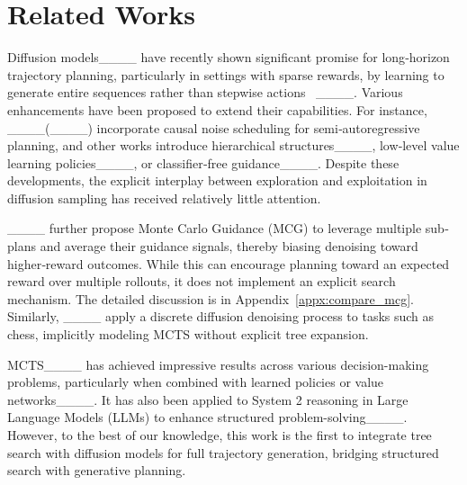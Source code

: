 \section{Related Works}
Diffusion models____ have recently shown significant promise for long‐horizon trajectory planning, particularly in settings with sparse rewards, by learning to generate entire sequences rather than stepwise actions~ ____. Various enhancements have been proposed to extend their capabilities. For instance, ____(____) incorporate causal noise scheduling for semi‐autoregressive planning, and other works introduce hierarchical structures____, low‐level value learning policies____, or classifier‐free guidance____. Despite these developments, the explicit interplay between exploration and exploitation in diffusion sampling has received relatively little attention.

____ further propose Monte Carlo Guidance (MCG) to leverage multiple sub‐plans and average their guidance signals, thereby biasing denoising toward higher‐reward outcomes. While this can encourage planning toward an expected reward over multiple rollouts, it does not implement an explicit search mechanism. The detailed discussion is in Appendix~\ref{appx:compare_mcg}. Similarly, ____ apply a discrete diffusion denoising process to tasks such as chess, implicitly modeling MCTS without explicit tree expansion. 

MCTS____ has achieved impressive results across various decision-making problems, particularly when combined with learned policies or value networks____. It has also been applied to System 2 reasoning in Large Language Models (LLMs) to enhance structured problem-solving____. However, to the best of our knowledge, this work is the first to integrate tree search with diffusion models for full trajectory generation, bridging structured search with generative planning.








